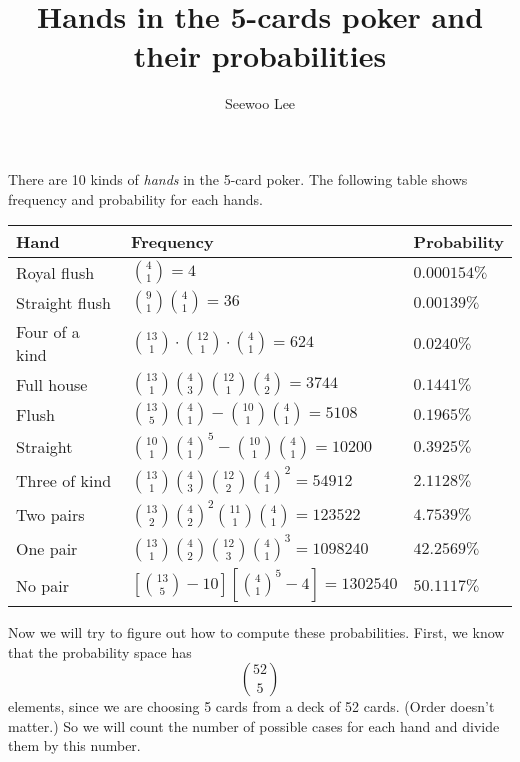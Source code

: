 \documentclass{article}
\title{Hands in the 5-cards poker and their probabilities}
\author{Seewoo Lee}
\begin{document}
\maketitle

There are 10 kinds of \emph{hands} in the 5-card poker. The following table shows frequency and probability for each hands.
\begin{center}
\def\arraystretch{2}
\begin{tabular}{|l|l|l|}
\hline
Hand           & Frequency                                                                     & Probability  \\ \hline \hline
Royal flush    & $\binom{4}{1} = 4$                                                            & $0.000154\%$ \\ \hline
Straight flush & $\binom{9}{1} \binom{4}{1} = 36$                                                   & $0.00139\%$  \\ \hline
Four of a kind & $\binom{13}{1}\cdot \binom{12}{1}\cdot \binom{4}{1} = 624$                    & $0.0240\%$   \\ \hline
Full house     & $\binom{13}{1} \binom{4}{3} \binom{12}{1} \binom{4}{2} = 3744$                & $0.1441\%$   \\ \hline
Flush          & $\binom{13}{5}\binom{4}{1} - \binom{10}{1} \binom{4}{1} = 5108$                  & $0.1965\%$   \\ \hline
Straight       & $\binom{10}{1}\binom{4}{1}^{5} - \binom{10}{1}\binom{4}{1} = 10200$           & $0.3925\%$   \\ \hline
Three of kind  & $\binom{13}{1}\binom{4}{3}\binom{12}{2}\binom{4}{1}^{2} = 54912$              & $2.1128\%$   \\ \hline
Two pairs      & $\binom{13}{2}\binom{4}{2}^{2}\binom{11}{1}\binom{4}{1} = 123522$             & $4.7539\%$   \\ \hline
One pair       & $\binom{13}{1}\binom{4}{2}\binom{12}{3}\binom{4}{1}^{3} = 1098240$            & $42.2569\%$  \\ \hline
No pair        & $\left[\binom{13}{5} - 10 \right]\left[\binom{4}{1}^{5} - 4\right] = 1302540$ & $50.1117\%$  \\ \hline
\end{tabular}\end{center}

Now we will try to figure out how to compute these probabilities. 
First, we know that the probability space has
$$
\binom{52}{5}
$$
elements, since we are choosing 5 cards from a deck of 52 cards. (Order doesn't matter.)
So we will count the number of possible cases for each hand and divide them by this number. 
\end{document}
